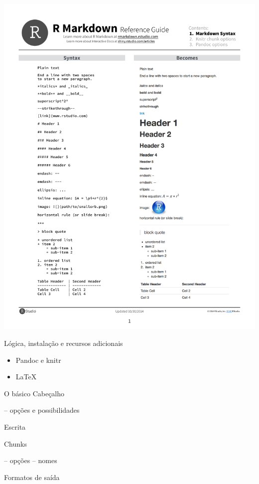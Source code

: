 \documentclass[
  9pt,
  ignorenonframetext,
]{beamer}
\begin{document}
\begin{frame}{}
\protect\hypertarget{section-2}{}
\includegraphics{imgs/rmarkdown-reference.pdf}
\end{frame}

\begin{frame}{Lógica, instalação e recursos adicionais}
\protect\hypertarget{luxf3gica-instalauxe7uxe3o-e-recursos-adicionais}{}
\begin{itemize}
\item
  Pandoc e knitr
\item
  LaTeX
\end{itemize}
\end{frame}

\begin{frame}{O básico}
\protect\hypertarget{o-buxe1sico}{}
Cabeçalho

-- opções e possibilidades

Escrita

Chunks

-- opções -- nomes

Formatos de saída
\end{frame}
\end{document}
